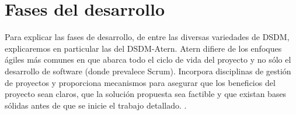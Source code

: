 \documentclass[12pt,a4paper]{article}
\begin{document}

\section{Fases del desarrollo}
Para explicar las fases de desarrollo, de entre las diversas variedades de DSDM, explicaremos en particular las del DSDM-Atern. Atern difiere de los enfoques ágiles más comunes en que abarca todo el ciclo de vida del proyecto y no sólo el desarrollo de software (donde prevalece Scrum). Incorpora disciplinas de gestión de proyectos y proporciona mecanismos para asegurar que los beneficios del proyecto sean claros, que la solución propuesta sea factible y que existan bases sólidas antes de que se inicie el trabajo detallado. .
\end{document}
